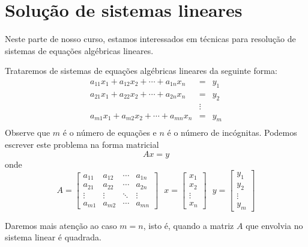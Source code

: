 
%

\chapter{Solução de sistemas lineares}

Neste parte de nosso curso, estamos interessados em técnicas para resolução de sistemas de equações algébricas lineares. 

Trataremos de sistemas de equações algébricas lineares da seguinte forma:
\begin{eqnarray*}
a_{11}x_1 + a_{12}x_2 + \cdots +a_{1n}x_n &=& y_1\\
a_{21}x_1 + a_{22}x_2 + \cdots +a_{2n}x_n &=& y_2\\
 &\vdots &\\
a_{m1}x_1 + a_{m2}x_2 + \cdots +a_{mn}x_n &=& y_m\\
\end{eqnarray*}
Observe que $m$ é o número de equações e $n$ é o número de incógnitas.  Podemos escrever este problema na forma matricial
$$Ax=y$$
onde
$$A=\left[\begin{array}{cccc}
a_{11} & a_{12} & \cdots & a_{1n}\\
a_{21} & a_{22} & \cdots & a_{2n}\\
\vdots & \vdots & \ddots & \vdots\\
a_{m1} & a_{m2} & \cdots & a_{mn}
\end{array}
\right]~~~x=\left[\begin{array}{c}
x_{1} \\
x_{2} \\
\vdots \\
x_{n}
\end{array}
\right]~~~y=\left[\begin{array}{c}
y_{1} \\
y_{2} \\
\vdots \\
y_{m}
\end{array}
\right]$$

Daremos mais atenção ao caso $m=n$, isto é, quando a matriz $A$ que envolvia no sistema linear é quadrada.


